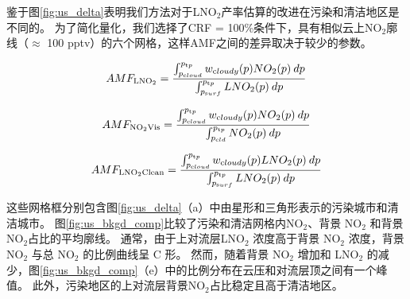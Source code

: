 鉴于图\ref{fig:us_delta}表明我们方法对于LNO$_2$产率估算的改进在污染和清洁地区是不同的。
为了简化量化，我们选择了CRF = 100\%条件下，具有相似云上NO$_2$廓线（$\approx$ 100 pptv）的六个网格，这样AMF之间的差异取决于较少的参数。

\begin{equation} \label{AMFLNO2_crf100}
AMF_{\textrm{LNO$_2$}} = \frac{\int_{p_{\textrm cloud}}^{p_{\textrm tp}} w_{\textrm cloudy}(p) NO_2(p) \: dp}{\int_{p_{\textrm surf}}^{p_{\textrm tp}} LNO_2(p) \: dp}
\end{equation}

\begin{equation} \label{AMFNO2Vis_crf100}
AMF_{\textrm{NO$_2$Vis}} = \frac{\int_{p_{\textrm cloud}}^{p_{\textrm tp}} w_{\textrm cloudy}(p) NO_2(p) \: dp}{\int_{p_{\textrm cld}}^{p_{\textrm tp}} NO_2(p) \: dp}
\end{equation}

\begin{equation} \label{AMFLNO2Clean_crf100}
AMF_{\textrm{LNO$_2$Clean}} = \frac{\int_{p_{\textrm cloud}}^{p_{\textrm tp}} w_{\textrm cloudy}(p) LNO_2(p) \: dp}{\int_{p_{\textrm surf}}^{p_{\textrm tp}} LNO_2(p) \: dp}
\end{equation}

这些网格框分别包含图\ref{fig:us_delta}（a）中由星形和三角形表示的污染城市和清洁城市。
图\ref{fig:us_bkgd_comp}比较了污染和清洁网格内NO$_2$、背景 NO$_2$ 和背景 NO$_2$占比的平均廓线。
通常，由于上对流层LNO$_2$ 浓度高于背景 NO$_2$ 浓度，背景 NO$_2$ 与总 NO$_2$ 的比例曲线呈 C 形。
然而，随着背景 NO$_2$ 增加和 LNO$_2$ 的减少，图\ref{fig:us_bkgd_comp}（e）中的比例分布在云压和对流层顶之间有一个峰值。
此外，污染地区的上对流层背景NO$_2$占比稳定且高于清洁地区。

